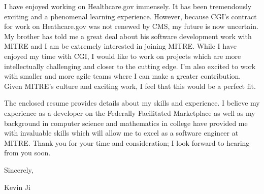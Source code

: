 \documentclass[10pt, letterpaper]{letter}
\begin{document}
I have enjoyed working on Healthcare.gov immensely. It has been tremendously exciting and a phenomenal learning experience. However, because CGI's contract for work on Heathcare.gov was not renewed by CMS, my future is now uncertain. My brother has told me a great deal about his software development work with MITRE and I am be extremely interested in joining MITRE. While I have enjoyed my time with CGI, I would like to work on projects which are more intellectually challenging and closer to the cutting edge. I'm also excited to work with smaller and more agile teams where I can make a greater contribution. Given MITRE's culture and exciting work, I feel that this would be a perfect fit. 

The enclosed resume provides details about my skills and experience. I believe my experience as a developer on the Federally Facilitated Marketplace as well as my background in computer science and mathematics in college have provided me with invaluable skills which will allow me to excel as a software engineer at MITRE. Thank you for your time and consideration; I look forward to hearing from you soon. 

Sincerely,

Kevin Ji
\end{document}
